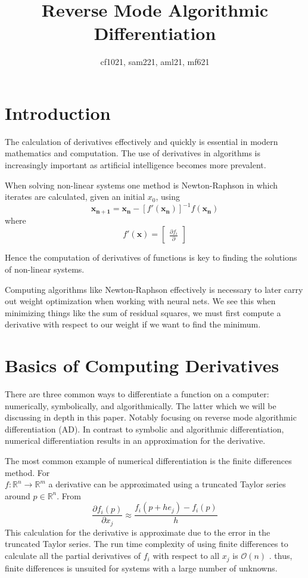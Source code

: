 \documentclass{article}
\title{Reverse Mode Algorithmic Differentiation}
\author{cf1021, sam221, aml21, mf621}
\date{}
\begin{document}
\maketitle
\tableofcontents

\section{Introduction}

The calculation of derivatives effectively and quickly is essential in modern mathematics and computation. The use of derivatives in algorithms is increasingly important as artificial intelligence becomes more prevalent.

When solving non-linear systems one method is Newton-Raphson in which iterates are calculated, given an initial $x_0$, using
\begin{equation}
\mathbf{x_{n+1}} = \mathbf{x_n} - [f'(\mathbf{x_n})]^{-1}f(\mathbf{x_n})
\end{equation}
where
\begin{equation}
    f'(\mathbf{x}) = \begin{bmatrix}
        \frac{\partial f_i}{\partial }
    \end{bmatrix}
\end{equation}
 
Hence the computation of derivatives of functions is key to finding the solutions of non-linear systems.

Computing algorithms like Newton-Raphson effectively is necessary to later carry out weight optimization when working with neural nets. We see this when minimizing things like the sum of residual squares, we must first compute a derivative with respect to our weight if we want to find the minimum.

\section{Basics of Computing Derivatives}

There are three common ways to differentiate a function on a computer: numerically, symbolically, and algorithmically. The latter which we will be discussing in depth in this paper. Notably focusing on reverse mode algorithmic differentiation (AD). In contrast to symbolic and algorithmic differentiation, numerical differentiation results in an approximation for the derivative.

The most common example of numerical differentiation is the finite differences method. For \\ $f: \mathbb{R}^n \longrightarrow \mathbb{R}^m$ a derivative can be approximated using a truncated Taylor series around $p \in \mathbb{R}^n$. From \cite{chem}
\begin{equation*}
    \frac{\partial f_i (p)}{\partial x_j} \approx \frac{f_i(p+he_j) - f_i(p)}{h}
\end{equation*}
This calculation for the derivative is approximate due to the error in the truncated Taylor series. The run time complexity of using finite differences to calculate all the partial derivatives of $f_i$ with respect to all $x_j$ is $\mathcal{O}(n)$ \cite{dhamarticle}. thus, finite differences is unsuited for systems with a large number of unknowns.
\end{document}
